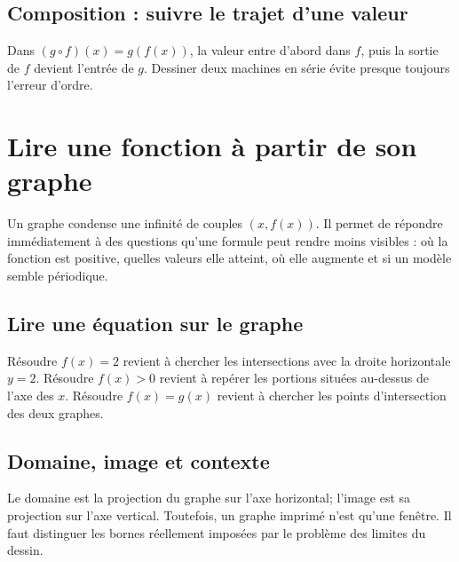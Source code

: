 \documentclass[12pt,a4paper,openany]{book}
\begin{document}
\subsection{Composition : suivre le trajet d'une valeur}
Dans $(g\circ f)(x)=g(f(x))$, la valeur entre d'abord dans $f$, puis la sortie de $f$ devient l'entrée de $g$. Dessiner deux machines en série évite presque toujours l'erreur d'ordre.


\section{Lire une fonction à partir de son graphe}

Un graphe condense une infinité de couples $(x,f(x))$. Il permet de répondre immédiatement à des questions qu'une formule peut rendre moins visibles : où la fonction est positive, quelles valeurs elle atteint, où elle augmente et si un modèle semble périodique.

\begin{center}
\end{center}

\subsection{Lire une équation sur le graphe}
Résoudre $f(x)=2$ revient à chercher les intersections avec la droite horizontale $y=2$. Résoudre $f(x)>0$ revient à repérer les portions situées au-dessus de l'axe des $x$. Résoudre $f(x)=g(x)$ revient à chercher les points d'intersection des deux graphes.

\subsection{Domaine, image et contexte}
Le domaine est la projection du graphe sur l'axe horizontal; l'image est sa projection sur l'axe vertical. Toutefois, un graphe imprimé n'est qu'une fenêtre. Il faut distinguer les bornes réellement imposées par le problème des limites du dessin.
\end{document}
